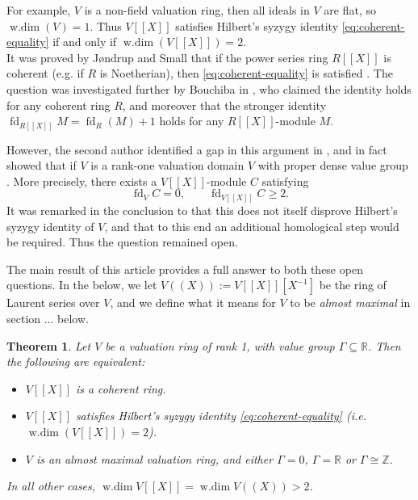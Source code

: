 \documentclass[12pt]{amsart}
\newcounter{lthm}
\theoremstyle{plain}
\newtheorem{letterthm}[lthm]{Theorem}
\newcommand{\wdim}{\operatorname{w.dim}}
\newcommand{\fd}{\operatorname{fd}}
\begin{document}
\noindent For example, $V$ is a non-field valuation ring, then all ideals in $V$ are flat, so $\wdim(V)=1$. Thus $V[[X]]$ satisfies Hilbert's syzygy identity \eqref{eq:coherent-equality} if and only if $\wdim(V[[X]])=2$.\\

\noindent It was proved by J{\o}ndrup and Small that if the power series ring $R[[X]]$ is coherent (e.g. if $R$ is Noetherian), then \eqref{eq:coherent-equality} is satisfied \cite[Lemma 1]{JondrupSmall}. The question was investigated further by Bouchiba in \cite{Bouchiba}, who claimed the identity holds for any coherent ring $R$, and moreover that the stronger identity $\fd_{R[[X]]}M=\fd_R(M)+1$ holds for any $R[[X]]$-module $M$. 

However, the second author identified a gap in this argument in \cite{Bouchiba}, and in fact showed that if $V$ is a rank-one valuation domain $V$ with proper dense value group \cite[Theorem A]{Jones}. More precisely, there exists a $V[[X]]$-module $C$ satisfying
\[
  \fd_V C=0,
  \qquad
  \fd_{V[[X]]}C\geq2.
\]
It was remarked in the conclusion to \cite{Jones} that this does not itself disprove Hilbert's syzygy identity of $V$, and that to this end an additional homological step would be required. Thus the question remained open.

The main result of this article provides a full answer to both these open questions. In the below, we let $V((X)):=V[[X]][X^{-1}]$ be the ring of Laurent series over $V$, and we define what it means for $V$ to be \emph{almost maximal} in section ... below.



\begin{letterthm}\label{main_theorem}
Let $V$ be a valuation ring of rank 1, with value group $\Gamma\subseteq\mathbb{R}$. Then the following are equivalent:

\begin{itemize}
    \item[i.] $V[[X]]$ is a coherent ring.

    \item[ii.] $V[[X]]$ satisfies Hilbert's syzygy identity \eqref{eq:coherent-equality} (i.e. $\wdim(V[[X]])=2$).

    \item[iii.] $V$ is an almost maximal valuation ring, and either $\Gamma=0$, $\Gamma=\mathbb{R}$ or $\Gamma\cong\mathbb{Z}$.
\end{itemize}

\noindent In all other cases, $\wdim V[[X]]=\wdim V((X))>2$.

\end{letterthm}
\end{document}
